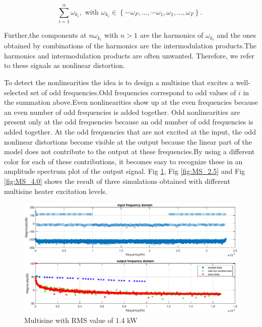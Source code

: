 \documentclass[a4paper,12pt]{article}
\numberwithin{equation}{section}
\begin{document}
\[\sum_{i=1}^{\alpha} \omega_{k_{i}}, \text { with } \omega_{k_{i}} \in\left\{-\omega_{F}, \ldots,-\omega_{1}, \omega_{1}, \ldots, \omega_{F}\right\} \text {. }\]

Further,the components at $n\omega_{k_{i}}$ with $n > 1$ are the harmonics of $\omega_{k_{i}}$ and the ones obtained by combinations of the harmonics are the intermodulation products.The harmonics and intermodulation products are often unwanted. Therefore, we refer to these signals as nonlinear distortion.

To detect the nonlinearities the idea is to design a multisine  that excites a well-selected set of odd frequencies.Odd frequencies correspond  to odd values of $i$ in the summation above.Even nonlinearities show up at the even frequencies because an even number of odd frequencies is added together. Odd nonlinearities are present only at the odd frequencies because an odd number of odd frequencies is added together. At the odd frequencies that are not excited at the input, the odd nonlinear distortions become visible at the output because the linear part of the model does not contribute to the output at these frequencies.By using a different color for each of these
contributions, it becomes easy to recognize these in an amplitude spectrum plot of the output signal. Fig \ref{fig:MS_1.4},  Fig \ref{fig:MS_2.5} and  Fig \ref{fig:MS_4.0} shows the result of three simulations obtained with different multisine heater  excitation levels.

\begin{figure}[H]
    \includegraphics[scale=0.6]{fdomain_input_rms_1400.eps}
    \centering
    \caption{Multisine with RMS value of 1.4 kW}
    \label{fig:MS_1.4}
\end{figure}
\end{document}
